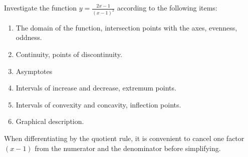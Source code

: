 
\begin{question}
Investigate the function $y=\frac{2x-1}{(x-1)^2}$ according to the following items:
\begin{enumerate}
  \item The domain of the function, intersection points with the axes, evenness, oddness.
  \item Continuity, points of discontinuity.
  \item Asymptotes
  \item Intervals of increase and decrease, extremum points.
  \item Intervals of convexity and concavity, inflection points.
  \item Graphical description.
\end{enumerate}
\end{question}

\begin{hint}
When differentiating by the quotient rule, it is convenient to cancel one factor $(x-1)$ from the numerator and the denominator before simplifying.
\end{hint}

